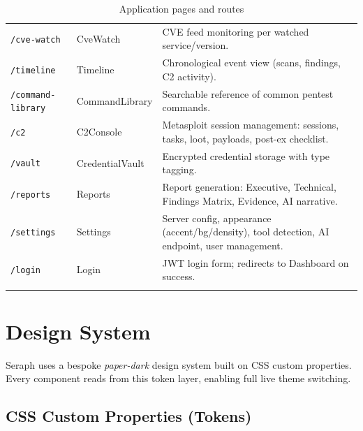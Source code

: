 \documentclass[11pt,a4paper,twoside,openright]{book}
\begin{document}
\begin{longtable}{L{3.5cm} L{4cm} X}
\texttt{/cve-watch}      & CveWatch             & CVE feed monitoring per watched service/version. \\
\texttt{/timeline}       & Timeline             & Chronological event view (scans, findings, C2 activity). \\
\texttt{/command-library}& CommandLibrary       & Searchable reference of common pentest commands. \\
\texttt{/c2}             & C2Console            & Metasploit session management: sessions, tasks, loot, payloads, post-ex checklist. \\
\texttt{/vault}          & CredentialVault      & Encrypted credential storage with type tagging. \\
\texttt{/reports}        & Reports              & Report generation: Executive, Technical, Findings Matrix, Evidence, AI narrative. \\
\texttt{/settings}       & Settings             & Server config, appearance (accent/bg/density), tool detection, AI endpoint, user management. \\
\texttt{/login}          & Login                & JWT login form; redirects to Dashboard on success. \\
\bottomrule
\caption{Application pages and routes}
\end{longtable}

\section{Design System}

Seraph uses a bespoke \emph{paper-dark} design system built on CSS custom properties. Every component reads from this token layer, enabling full live theme switching.

\subsection{CSS Custom Properties (Tokens)}
\end{document}
